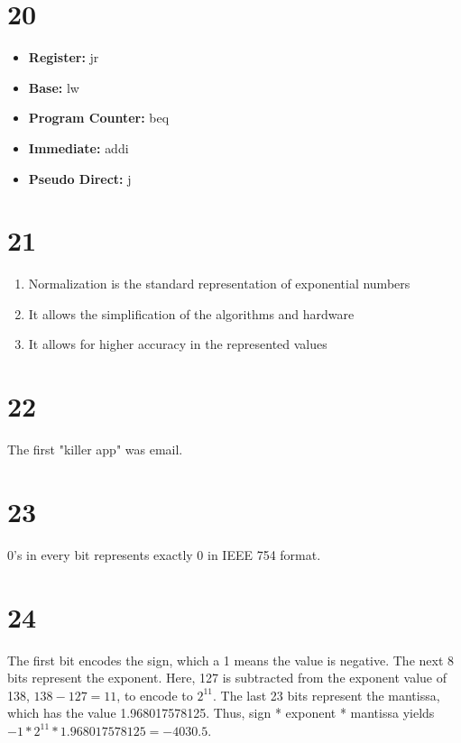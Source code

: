\documentclass[a4paper,11pt]{article}
\begin{document}
\section*{20}
\begin{itemize}
  \item {\bf Register: } jr
  \item {\bf Base: } lw
  \item {\bf Program Counter: } beq
  \item {\bf Immediate: } addi
  \item {\bf Pseudo Direct:}  j
\end{itemize}


\section*{21}

\begin{enumerate}
  \item Normalization is the standard representation of exponential numbers
  \item It allows the simplification of the algorithms and hardware
  \item It allows for higher accuracy in the represented values
\end{enumerate}


\section*{22}
The first "killer app" was email.

\section*{23}
0's in every bit represents exactly 0 in IEEE 754 format.


\section*{24}
The first bit encodes the sign, which a 1 means the value is negative.  The next 8 bits represent the exponent.  Here, 127 is subtracted from the exponent value of 138, $138 - 127 = 11$, to encode to $2^{11}$.  The last 23 bits represent the mantissa, which has the value 1.968017578125.  Thus, sign * exponent * mantissa yields $-1 * 2^{11} *  1.968017578125 = -4030.5$.
\end{document}
